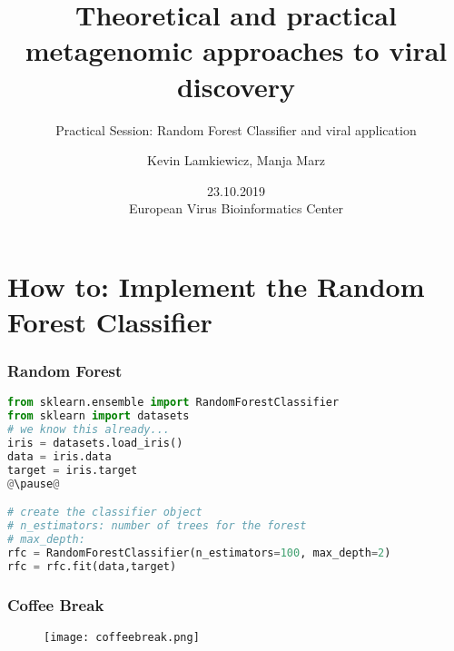 

\title{Theoretical and practical metagenomic approaches to viral discovery}
\subtitle{Practical Session: Random Forest Classifier and viral application}
\author{Kevin Lamkiewicz, Manja Marz}
\date{23.10.2019\\[1em]European Virus Bioinformatics Center}



\begin{frame}
  \maketitle
\end{frame}

\section[Implementation]{How to: Implement the Random Forest Classifier}

\begin{frame}[c,fragile]\frametitle{Random Forest}
  \begin{lstlisting}[language=Python]
from sklearn.ensemble import RandomForestClassifier
from sklearn import datasets
# we know this already...
iris = datasets.load_iris()
data = iris.data
target = iris.target
@\pause@

# create the classifier object
# n_estimators: number of trees for the forest
# max_depth: 
rfc = RandomForestClassifier(n_estimators=100, max_depth=2)
rfc = rfc.fit(data,target)
  \end{lstlisting}
\end{frame}

\beginbackup

\begin{frame}[c]\frametitle{Coffee Break}
  \begin{figure}[htbp]
    \centering
    \texttt{[image: coffeebreak.png]}
  \end{figure}
\end{frame}

\backupend

